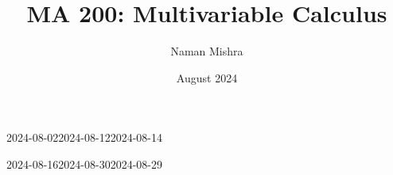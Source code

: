 \documentclass[12pt]{report}
\title{MA 200: Multivariable Calculus}
\author{Naman Mishra}
\date{August 2024}
\begin{document}
\maketitle
\tableofcontents
\newpage
\listoflecture
\listofhw
    
    
    
    
        {2024-08-02}{2024-08-12}{2024-08-14}
    
    
    
    
    
    
        {2024-08-16}{2024-08-30}{2024-08-29}
    
    
\end{document}
